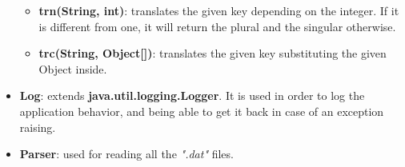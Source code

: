 \documentclass[11pt]{article}
\begin{document}
\begin{itemize}
\begin{itemize}
			\item \textbf{trn(String, int)}: translates the given key depending on the integer. If it is different from one, it will return the plural and the singular otherwise.
			\item \textbf{trc(String, Object[])}: translates the given key substituting the given Object inside.
		\end{itemize}
		\item \textbf{Log}: extends \textbf{java.util.logging.Logger}. It is used in order to log the application behavior, and being able to get it back in case of an exception raising.
		\item \textbf{Parser}: used for reading all the \textit{".dat"} files.
   \end{itemize}
\end{document}

